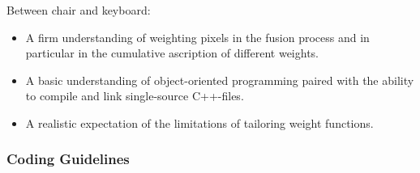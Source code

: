Between chair and keyboard:

\begin{itemize}
\item
  A firm understanding of weighting pixels in the fusion process and
  in particular in the cumulative ascription of different weights.

\item
  A basic understanding of object-oriented programming paired with the
  ability to compile and link single-source C++-files.

\item
  A realistic expectation of the limitations of tailoring weight
  functions.
\end{itemize}


\subsubsection[Coding Guidelines]{Coding Guidelines
  \label{sec:coding-guidelines}
  }

